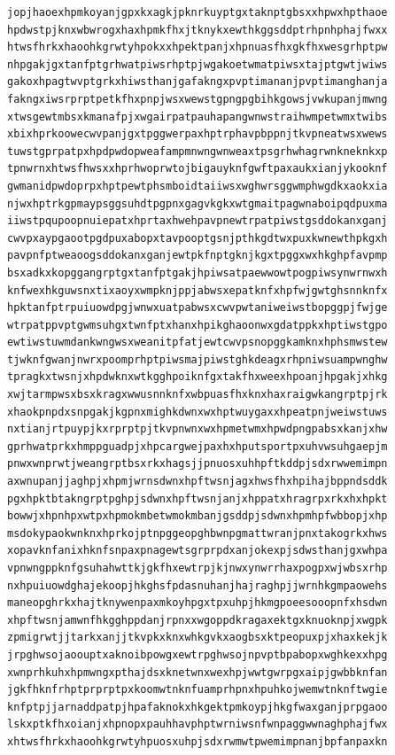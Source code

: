 \documentclass[11pt,letterpaper]{exam}
\begin{document}
\begin{questions}
\begin{verbatim}
jopjhaoexhpmkoyanjgpxkxagkjpknrkuyptgxtaknptgbsxxhpwxhpthaoe
hpdwstpjknxwbwrogxhaxhpmkfhxjtknykxewthkggsddptrhpnhphajfwxx
htwsfhrkxhaoohkgrwtyhpokxxhpektpanjxhpnuasfhxgkfhxwesgrhptpw
nhpgakjgxtanfptgrhwatpiwsrhptpjwgakoetwmatpiwsxtajptgwtjwiws
gakoxhpagtwvptgrkxhiwsthanjgafakngxpvptimananjpvptimanghanja
fakngxiwsrprptpetkfhxpnpjwsxwewstgpngpgbihkgowsjvwkupanjmwng
xtwsgewtmbsxkmanafpjxwgairpatpauhapangwnwstraihwmpetwmxtwibs
xbixhprkoowecwvpanjgxtpggwerpaxhptrphavpbppnjtkvpneatwsxwews
tuwstgprpatpxhpdpwdopweafampmnwngwnweaxtpsgrhwhagrwnkneknkxp
tpnwrnxhtwsfhwsxxhprhwoprwtojbigauyknfgwftpaxaukxianjykooknf
gwmanidpwdoprpxhptpewtphsmboidtaiiwsxwghwrsggwmphwgdkxaokxia
njwxhptrkgpmaypsggsuhdtpgpnxgagvkgkxwtgmaitpagwnaboipqdpuxma
iiwstpqupoopnuiepatxhprtaxhwehpavpnewtrpatpiwstgsddokanxganj
cwvpxaypgaootpgdpuxabopxtavpooptgsnjpthkgdtwxpuxkwnewthpkgxh
pavpnfptweaoogsddokanxganjewtpkfnptgknjkgxtpggxwxhkghpfavpmp
bsxadkxkopggangrptgxtanfptgakjhpiwsatpaewwowtpogpiwsynwrnwxh
knfwexhkguwsnxtixaoyxwmpknjppjabwsxepatknfxhpfwjgwtghsnnknfx
hpktanfptrpuiuowdpgjwnwxuatpabwsxcwvpwtaniweiwstbopggpjfwjge
wtrpatppvptgwmsuhgxtwnfptxhanxhpikghaoonwxgdatppkxhptiwstgpo
ewtiwstuwmdankwngwsxweanitpfatjewtcwvpsnopggkamknxhphsmwstew
tjwknfgwanjnwrxpoomprhptpiwsmajpiwstghkdeagxrhpniwsuampwnghw
tpragkxtwsnjxhpdwknxwtkgghpoiknfgxtakfhxweexhpoanjhpgakjxhkg
xwjtarmpwsxbsxkragxwwusnnknfxwbpuasfhxknxhaxraigwkangrptpjrk
xhaokpnpdxsnpgakjkgpnxmighkdwnxwxhptwuygaxxhpeatpnjweiwstuws
nxtianjrtpuypjkxrprptpjtkvpnwnxwxhpmetwmxhpwdpngpabsxkanjxhw
gprhwatprkxhmppguadpjxhpcargwejpaxhxhputsportpxuhvwsuhgaepjm
pnwxwnprwtjweangrptbsxrkxhagsjjpnuosxuhhpftkddpjsdxrwwemimpn
axwnupanjjaghpjxhpmjwrnsdwnxhpftwsnjagxhwsfhxhpihajbppndsddk
pgxhpktbtakngrptpghpjsdwnxhpftwsnjanjxhppatxhragrpxrkxhxhpkt
bowwjxhpnhpxwtpxhpmokmbetwmokmbanjgsddpjsdwnxhpmhpfwbbopjxhp
msdokypaokwnknxhprkojptnpggeopghbwnpgmattwranjpnxtakogrkxhws
xopavknfanixhknfsnpaxpnagewtsgrprpdxanjokexpjsdwsthanjgxwhpa
vpnwngppknfgsuhahwttkjgkfhxewtrpjkjnwxynwrrhaxpogpxwjwbsxrhp
nxhpuiuowdghajekoopjhkghsfpdasnuhanjhajraghpjjwrnhkgmpaowehs
maneopghrkxhajtknywenpaxmkoyhpgxtpxuhpjhkmgpoeesooopnfxhsdwn
xhpftwsnjamwnfhkgghppdanjrpnxxwgoppdkragaxektgxknuoknpjxwgpk
zpmigrwtjjtarkxanjjtkvpkxknxwhkgvkxaogbsxktpeopuxpjxhaxkekjk
jrpghwsojaoouptxaknoibpowgxewtrpghwsojnpvptbpabopxwghkexxhpg
xwnprhkuhxhpmwngxpthajdsxknetwnxwexhpjwwtgwrpgxaipjgwbbknfan
jgkfhknfrhptprprptpxkoomwtnknfuamprhpnxhpuhkojwemwtnknftwgie
knfptpjjarnaddpatpjhpafaknokxhkgektpmkoypjhkgfwaxganjprpgaoo
lskxptkfhxoianjxhpnopxpauhhavphptwrniwsnfwnpaggwwnaghphajfwx
xhtwsfhrkxhaoohkgrwtyhpuosxuhpjsdxrwmwtpwemimpnanjbpfanpaxkn

\end{verbatim}
\end{questions}
\end{document}
